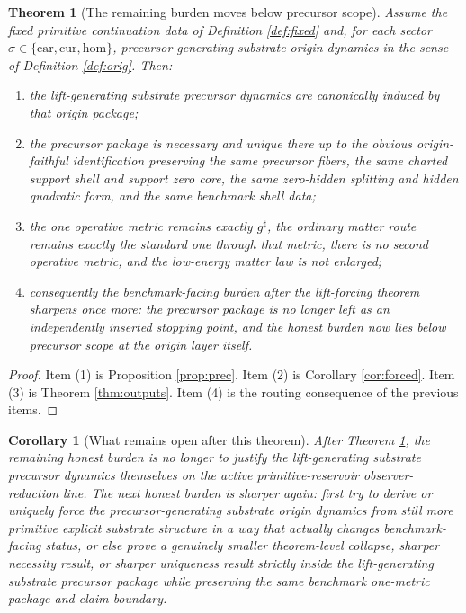 \documentclass[11pt]{article}
\newcommand{\CompletedMetric}{g^{\sharp}}
\newcommand{\Car}{\mathrm{car}}
\newcommand{\Cur}{\mathrm{cur}}
\newcommand{\Hom}{\mathrm{hom}}
\newtheorem{corollary}{Corollary}
\newtheorem{theorem}{Theorem}
\begin{document}
\begin{theorem}[The remaining burden moves below precursor scope]
\label{thm:main}
Assume the fixed primitive continuation data of Definition \ref{def:fixed} and, for each sector \(\sigma\in\{\Car,\Cur,\Hom\}\), precursor-generating substrate origin dynamics in the sense of Definition \ref{def:orig}. Then:
\begin{enumerate}
    \item the lift-generating substrate precursor dynamics are canonically induced by that origin package;
    \item the precursor package is necessary and unique there up to the obvious origin-faithful identification preserving the same precursor fibers, the same charted support shell and support zero core, the same zero-hidden splitting and hidden quadratic form, and the same benchmark shell data;
    \item the one operative metric remains exactly \(\CompletedMetric\), the ordinary matter route remains exactly the standard one through that metric, there is no second operative metric, and the low-energy matter law is not enlarged;
    \item consequently the benchmark-facing burden after the lift-forcing theorem sharpens once more: the precursor package is no longer left as an independently inserted stopping point, and the honest burden now lies below precursor scope at the origin layer itself.
\end{enumerate}
\end{theorem}

\begin{proof}
Item (1) is Proposition \ref{prop:prec}. Item (2) is Corollary \ref{cor:forced}. Item (3) is Theorem \ref{thm:outputs}. Item (4) is the routing consequence of the previous items.
\end{proof}

\begin{corollary}[What remains open after this theorem]
\label{cor:next}
After Theorem \ref{thm:main}, the remaining honest burden is no longer to justify the lift-generating substrate precursor dynamics themselves on the active primitive-reservoir observer-reduction line. The next honest burden is sharper again: first try to derive or uniquely force the precursor-generating substrate origin dynamics from still more primitive explicit substrate structure in a way that actually changes benchmark-facing status, or else prove a genuinely smaller theorem-level collapse, sharper necessity result, or sharper uniqueness result strictly inside the lift-generating substrate precursor package while preserving the same benchmark one-metric package and claim boundary.
\end{corollary}
\end{document}
